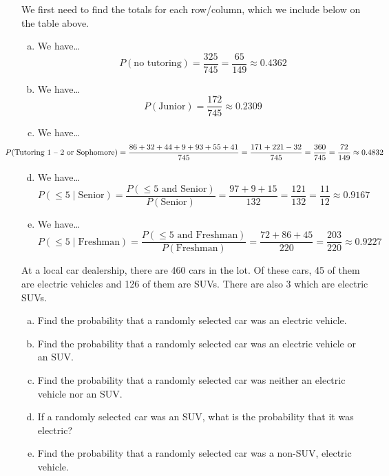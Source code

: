 \documentclass[11pt,letterpaper]{article}
\begin{document}
\sol We first need to find the totals for each row/column, which we include below on the table above.  
\begin{enumerate}[(a)]
\item We have\dots
	\[
	P(\text{no tutoring})= \dfrac{325}{745}= \dfrac{65}{149} \approx 0.4362
	\] \pspace

\item We have\dots
	\[
	P(\text{Junior})= \dfrac{172}{745} \approx 0.2309 
	\] \pspace

\item We have\dots
	\[
	\hspace{-1.5cm} P(\text{Tutoring 1 -- 2 or Sophomore})= \dfrac{86 + 32 + 44 + 9 + 93 + 55 + 41}{745}= \dfrac{171 + 221 - 32}{745}= \dfrac{360}{745}= \dfrac{72}{149} \approx 0.4832
	\] \pspace

\item We have\dots
	\[
	P(\leq 5 \;|\; \text{Senior})= \dfrac{P(\leq 5 \text{ and Senior})}{P(\text{Senior})}= \dfrac{97 + 9 + 15}{132}= \dfrac{121}{132}= \dfrac{11}{12} \approx 0.9167
	\] \pspace

\item We have\dots
	\[
	P(\leq 5 \;|\; \text{Freshman})= \dfrac{P(\leq 5 \text{ and Freshman})}{P(\text{Freshman})}= \dfrac{72 + 86 + 45}{220}= \dfrac{203}{220} \approx 0.9227
	\]
\end{enumerate} 



\newpage



 At a local car dealership, there are 460 cars in the lot. Of these cars, 45 of them are electric vehicles and 126 of them are SUVs. There are also 3 which are electric SUVs. 
	\begin{enumerate}[(a)]
	\item Find the probability that a randomly selected car was an electric vehicle. 
	\item Find the probability that a randomly selected car was an electric vehicle or an SUV.
	\item Find the probability that a randomly selected car was neither an electric vehicle nor an SUV.
	\item If a randomly selected car was an SUV, what is the probability that it was electric? 
	\item Find the probability that a randomly selected car was a non-SUV, electric vehicle. 
	\end{enumerate} \pspace
\end{document}
